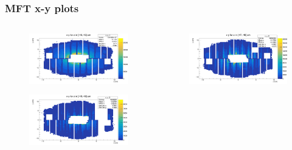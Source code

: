 \documentclass[11pt]{beamer}
\begin{document}
\begin{frame}
    \frametitle{MFT x-y plots}

    \begin{columns}[c]
        \begin{column}{0.5\textwidth}
            \begin{figure}
                \begin{center}
                    \includegraphics[width=\textwidth]{Plots/MFT_pass3/x_y_1.png}
                \end{center}
            \end{figure}
            \begin{figure}
                \begin{center}
                    \includegraphics[width=\textwidth]{Plots/MFT_pass3/x_y_3.png}
                \end{center}
            \end{figure}
        \end{column}
        \begin{column}{0.5\textwidth}
            \begin{figure}
                \begin{center}
                    \includegraphics[width=\textwidth]{Plots/MFT_pass3/x_y_2.png}

\end{center}
\end{figure}
\end{column}
\end{columns}
\end{frame}
\end{document}
